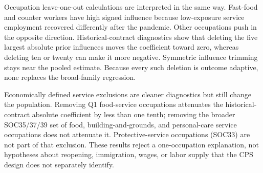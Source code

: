 Occupation leave-one-out calculations are interpreted in the same way.  Fast-food and counter workers have high signed influence because low-exposure service employment recovered differently after the pandemic.  Other occupations push in the opposite direction.  Historical-contract diagnostics show that deleting the five largest absolute prior influences moves the coefficient toward zero, whereas deleting ten or twenty can make it more negative.  Symmetric influence trimming stays near the pooled estimate.  Because every such deletion is outcome adaptive, none replaces the broad-family regression.

Economically defined service exclusions are cleaner diagnostics but still change the population.  Removing Q1 food-service occupations attenuates the historical-contract absolute coefficient by less than one tenth; removing the broader SOC35/37/39 set of food, building-and-grounds, and personal-care service occupations does not attenuate it.  Protective-service occupations (SOC33) are not part of that exclusion.  These results reject a one-occupation explanation, not hypotheses about reopening, immigration, wages, or labor supply that the CPS design does not separately identify.
